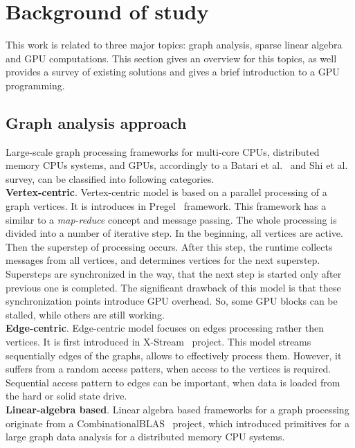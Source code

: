 \section{Background of study}

This work is related to three major topics: graph analysis, sparse linear algebra and GPU computations. This section gives an overview for this topics, as well provides a survey of existing solutions and gives a brief introduction to a GPU programming.

\subsection{Graph analysis approach}

Large-scale graph processing frameworks for multi-core CPUs, distributed memory CPUs systems, and GPUs, accordingly to a Batari et al.~\cite{article:batarfi_survey_graphs} and Shi et al.~\cite{article:shi_survey_graphs} survey, can be classified into following categories.\\

\textbf{Vertex-centric}. Vertex-centric model is based on a parallel processing of a graph vertices. It is introduces in Pregel~\cite{article:pregel} framework. This framework has a similar to a \textit{map-reduce} concept and message passing. The whole processing is divided into a number of iterative step. In the beginning, all vertices are active. Then the superstep of processing occurs. After this step, the runtime collects messages from all vertices, and determines vertices for the next superstep. Supersteps are synchronized in the way, that the next step is started only after previous one is completed. The significant drawback of this model is that these synchronization points introduce GPU overhead. So, some GPU blocks can be stalled, while others are still working.\\   

\textbf{Edge-centric}. Edge-centric model focuses on edges processing rather then vertices. It is first introduced in X-Stream~\cite{article:xstream} project. This model streams sequentially edges of the graphs, allows to effectively process them. However, it suffers from a random access patters, when access to the vertices is required. Sequential access pattern to edges can be important, when data is loaded from the hard or solid state drive.\\

\textbf{Linear-algebra based}. Linear algebra based frameworks for a graph processing originate from a CombinationalBLAS~\cite{article:combblas} project, which introduced primitives for a large graph data analysis for a distributed memory CPU systems. 

